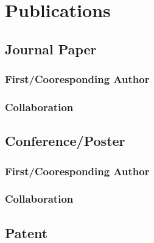 \documentclass{myCitation}
\begin{document}
\clearpage
\section{Publications}
\subsection{Journal Paper}
\begin{enumerate}
    \subsubsection{First/Cooresponding Author}
    
    \subsubsection{Collaboration}
    
\end{enumerate}

\subsection{Conference/Poster}
\begin{enumerate}
    \subsubsection{First/Cooresponding Author}
    
    \subsubsection{Collaboration}
    
\end{enumerate}

\subsection{Patent}
\begin{enumerate}
    
\end{enumerate}
\end{document}
